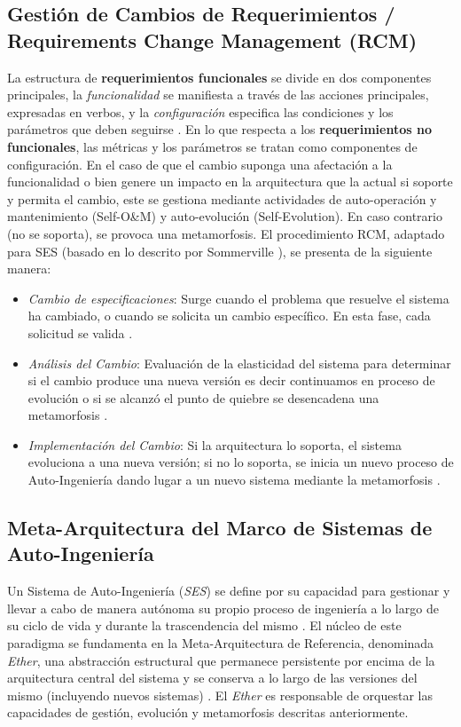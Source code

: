 \documentclass[12pt, letterpaper, oneside]{book}
\begin{document}
\subsection{Gestión de Cambios de Requerimientos / Requirements Change Management (RCM)}

La estructura de \textbf{requerimientos funcionales} se divide en dos componentes principales, la \textit{funcionalidad} se manifiesta a través de las acciones principales, expresadas en verbos, y la \textit{configuración} especifica las condiciones y los parámetros que deben seguirse \cite{PerezCarrillo2026}. 
En lo que respecta a los \textbf{requerimientos no funcionales}, las métricas y los parámetros se tratan como componentes de configuración.
En el caso de que el cambio suponga una afectación a la funcionalidad o bien genere un impacto en la arquitectura que la actual si soporte y permita el cambio, este se gestiona mediante actividades de auto-operación y mantenimiento (Self-O\&M) y auto-evolución (Self-Evolution).
En caso contrario (no se soporta), se provoca una metamorfosis.
El procedimiento RCM, adaptado para SES (basado en lo descrito por Sommerville \cite{sommerville2011software}), se presenta de la siguiente manera:

\begin{itemize}
	\item  \textit{Cambio de especificaciones}: Surge cuando el problema que resuelve el sistema ha cambiado, o cuando se solicita un cambio específico. En esta fase, cada solicitud se valida \cite{PerezCarrillo2026}.
	\item  \textit{Análisis del Cambio}: Evaluación de la elasticidad del sistema para determinar si el cambio produce una nueva versión es decir continuamos en proceso de evolución o si se alcanzó el punto de quiebre se desencadena una metamorfosis \cite{PerezCarrillo2026}.
	\item  \textit{Implementación del Cambio}: Si la arquitectura lo soporta, el sistema evoluciona a una nueva versión; si no lo soporta, se inicia un nuevo proceso de Auto-Ingeniería dando lugar a un nuevo sistema mediante la metamorfosis \cite{PerezCarrillo2026}.
\end{itemize}

\subsection{Meta-Arquitectura del Marco de Sistemas de Auto-Ingeniería}

Un Sistema de Auto-Ingeniería (\textit{SES}) se define por su capacidad para gestionar y llevar a cabo de manera autónoma su propio proceso de ingeniería a lo largo de su ciclo de vida y durante la trascendencia del mismo \cite{PerezCarrillo2026}. El núcleo de este paradigma se fundamenta en la Meta-Arquitectura de Referencia, denominada \textit{Ether}, una abstracción estructural que permanece persistente por encima de la arquitectura central del sistema y se conserva a lo largo de las versiones del mismo (incluyendo nuevos sistemas) \cite{PerezCarrillo2026}. El \textit{Ether} es responsable de orquestar las capacidades de gestión, evolución y metamorfosis descritas anteriormente.
\end{document}
